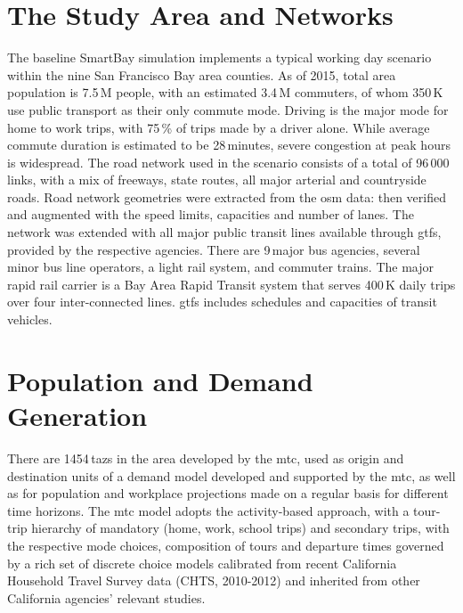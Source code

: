 \section{The Study Area and Networks}
The baseline SmartBay simulation implements a typical working day scenario within the nine San Francisco Bay area counties. As of 2015, total area population is 7.5\,M people, with an estimated 3.4\,M commuters, of whom 350\,K use public transport as their only commute mode. Driving is the major mode for home to work trips, with 75\,\% of trips made by a driver alone. While average commute duration is estimated to be 28\,minutes, severe congestion at peak hours is widespread. The road network used in the scenario consists of a total of 96\,000\,links, with a mix of freeways, state routes, all major arterial and countryside roads. Road network geometries were extracted from the \gls{osm} data: then verified and augmented with the speed limits, capacities and number of lanes. The network was extended with all major public transit lines available through \gls{gtfs}, provided by the respective agencies. There are 9\,major bus agencies, several minor bus line operators, a light rail system, and commuter trains. The major rapid rail carrier is a Bay Area Rapid Transit system that serves 400\,K daily trips over four inter-connected lines. \gls{gtfs} includes schedules and capacities of transit vehicles.

\section{Population and Demand Generation}
There are 1454\,\glspl{taz} in the area developed by the \gls{mtc}, used as origin and destination units of a demand model developed and supported by the \gls{mtc}, as well as for population and workplace projections made on a regular basis for different time horizons. The \gls{mtc} model adopts the activity-based approach, with a tour-trip hierarchy of mandatory (home, work, school trips) and secondary trips, with the respective mode choices, composition of tours and departure times governed by a rich set of discrete choice models calibrated from recent California Household Travel Survey data (CHTS, 2010-2012) and inherited from other California agencies' relevant studies. 

